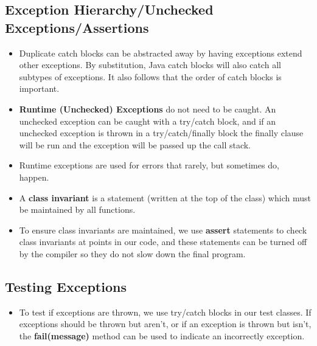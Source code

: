 \documentclass[letterpaper] {article}
\begin{document}
    \subsection{Exception Hierarchy/Unchecked Exceptions/Assertions}
    \begin{itemize}
        \item Duplicate catch blocks can be abstracted away by having exceptions extend other exceptions. By substitution, Java catch blocks will also catch all subtypes of exceptions. It also follows that the order of catch blocks is important. 
        \item \textbf{Runtime (Unchecked) Exceptions} do not need to be caught. An unchecked exception can be caught with a try/catch block, and if an unchecked exception is thrown in a try/catch/finally block the finally clause will be run and the exception will be passed up the call stack. 
        \item Runtime exceptions are used for errors that rarely, but sometimes do, happen. 
        \item A \textbf{class invariant} is a statement (written at the top of the class) which must be maintained by all functions. 
        \item To ensure class invariants are maintained, we use \textbf{assert} statements to check class invariants at points in our code, and these statements can be turned off by the compiler so they do not slow down the final program. 
    \end{itemize}
    
    \subsection{Testing Exceptions}
    \begin{itemize}
        \item To test if exceptions are thrown, we use try/catch blocks in our test classes. If exceptions should be thrown but aren't, or if an exception is thrown but isn't, the \textbf{fail(message)} method can be used to indicate an incorrectly exception. 
    \end{itemize}
\end{document}
